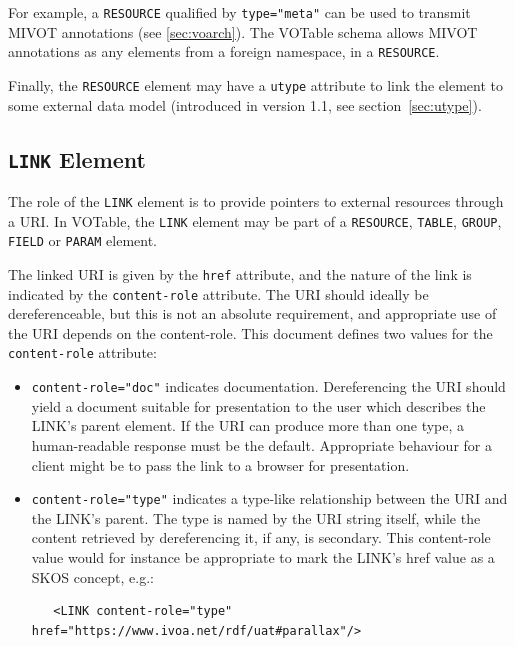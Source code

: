 \documentclass[11pt,a4paper]{ivoa}
\def\Aref#1{section~\ref{#1}}
\let\fg=\color
\def\attr#1{{\tt{\fg{DarkRed}#1}}}
\def\elem#1{{\tt{\fg{DarkRed}#1}}}
\def\attrval#1#2{{\tt{\fg{DarkRed}#1}="{\fg{DarkPurple}#2}"}}
\begin{document}
For example, a \elem{RESOURCE} qualified by
\attrval{type}{meta} can be used to transmit
MIVOT annotations (see \ref{sec:voarch}).  The VOTable schema allows MIVOT annotations as 
any elements from a foreign namespace, in a \elem{RESOURCE}.

Finally, the \elem{RESOURCE} element may have a \attr{utype} attribute
to link the element to some external data model
(introduced in version 1.1, see \Aref{sec:utype}).

\subsection{\elem{LINK} Element}
\label{sec:link}
\label{elem:LINK}

The role of the {\elem{LINK}} element is to provide pointers
to external resources
through a URI. In VOTable, the {\elem{LINK}}
element may be part of a {\elem{RESOURCE}},
{\elem{TABLE}}, \elem{GROUP}, {\elem{FIELD}} or \elem{PARAM} element.

The linked URI is given by the \attr{href} attribute,
and the nature of the link is indicated by the \attr{content-role} attribute.
The URI should ideally be dereferenceable,
but this is not an absolute requirement,
and appropriate use of the URI depends on the content-role.
This document defines two values for the \attr{content-role} attribute:

\begin{itemize}
\item \attrval{content-role}{doc} indicates documentation.
      Dereferencing the URI should yield a document suitable for
      presentation to the user which describes the LINK's parent element.
      If the URI can produce more than one type, a human-readable response
      must be the default.
      Appropriate behaviour for a client might be to pass the link to a browser
      for presentation.

\item \attrval{content-role}{type} indicates a type-like relationship
      between the URI and the LINK's parent.
      The type is named by the URI string itself,
      while the content retrieved by dereferencing it, if any, is secondary.
      This content-role value would for instance be appropriate
      to mark the LINK's href value as a SKOS concept, e.g.:
      \begin{verbatim}
   <LINK content-role="type" href="https://www.ivoa.net/rdf/uat#parallax"/>
      \end{verbatim}
\end{itemize}
\end{document}
